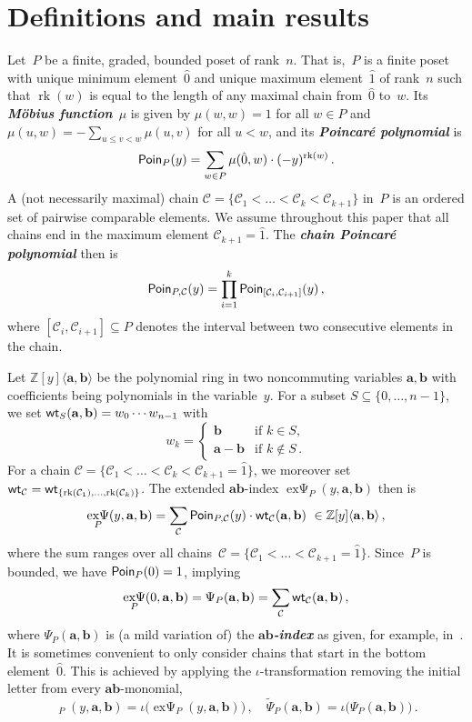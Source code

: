 \documentclass[a4paper, english,reqno, 11pt]{amsart}
\theoremstyle{plain}
\theoremstyle{definition}
\DeclareMathOperator{\expsi}{ex\Psi}
\DeclareMathOperator{\expsitilde}{ex\widetilde{\Psi}}
\newcommand{\rank}{\operatorname{rk}}
\newcommand{\aaa}{\mathbf{a}}
\newcommand{\bbb}{\mathbf{b}}
\newcommand{\ZZ}{\mathbb{Z}}
\newcommand{\Dfn}[1]{\emph{\bfseries #1}}
\newcommand{\wt}{{\sf wt}}
\newcommand{\cC}{\mathcal{C}}
\newcommand{\Poin}{\mathcal{\sf Poin}}
\begin{document}
\section{Definitions and main results}

Let~$P$ be a finite, graded, bounded poset of rank~$n$.
That is,~$P$ is a finite poset with unique minimum element~$\hat 0$ and unique maximum element~$\hat 1$ of rank~$n$ such that $\rank(w)$ is equal to the length of any maximal chain from~$\hat 0$ to~$w$.
Its \Dfn{Möbius function}~$\mu$ is given by $\mu(w, w) = 1$ for all $w\in P$ and $\mu(u,w) = -\sum_{u\leq v < w} \mu(u, v)$ for all $u < w$, and its \Dfn{Poincaré polynomial} is
\[
  \Poin_P(y) = \sum_{w\in P} \mu(\hat{0}, w) \cdot (-y)^{\rank(w)}\,.
\]
A (not necessarily maximal) chain $\cC = \{\cC_1 < \dots < \cC_k < \cC_{k+1}\}$ in~$P$ is an ordered set of pairwise comparable elements.
We assume throughout this paper that all chains end in the maximum element $\cC_{k+1} = \hat 1$.
The \Dfn{chain Poincaré polynomial} then is
\[
  \Poin_{P,\cC}(y)   =\prod_{i = 1}^k \Poin_{[\cC_i,\cC_{i+1}]}(y) \,,
\]
where $[\cC_i,\cC_{i+1}] \subseteq P$ denotes the interval between two consecutive elements in the chain.

\medskip

Let $\ZZ[y]\langle\aaa,\bbb\rangle$ be the polynomial ring in two noncommuting variables $\aaa,\bbb$ with coefficients being polynomials in the variable~$y$.
For a subset $S \subseteq \{0,\dots,n-1\}$, we set $\wt_S(\aaa,\bbb) = w_0\cdots w_{n-1}$ with
\begin{equation*}
  w_k = \begin{cases}
          \bbb        & \text{if } k\in S, \\
          \aaa - \bbb & \text{if } k\notin S\,.
        \end{cases}
\end{equation*}
For a chain $\cC = \{\cC_1 < \dots < \cC_k < \cC_{k+1} = \hat 1\}$, we moreover set $\wt_\cC = \wt_{\{\rank(\cC_1),\dots,\rank(\cC_k)\}}$.
The extended $\aaa\bbb$-index $\expsi_P(y,\aaa,\bbb)$ then is
\[
\expsi_P(y,\aaa,\bbb)
  = \sum_{\cC} \Poin_{P,\cC}(y) \cdot \wt_{\cC}(\aaa,\bbb) \ \in \ZZ[y]\langle\aaa,\bbb\rangle\,,
\]
where the sum ranges over all chains~$\cC = \{\cC_1 <\dots < \cC_{k+1} = \hat 1\}$.
Since~$P$ is bounded, we have $\Poin_P(0) = 1$, implying
\begin{equation}
\label{eq:abindex}
  \expsi_P(0,\aaa,\bbb)
  = \Psi_P(\aaa,\bbb)
  = \sum_{\cC} \wt_\cC(\aaa,\bbb)\,,
\end{equation}
where $\Psi_P(\aaa,\bbb)$ is (a mild variation of) the \Dfn{$\aaa\bbb$-index}  as given, for example, in~\cite{bayer-survey}.
It is sometimes convenient to only consider chains that start in the bottom element~$\hat 0$.
This is achieved by applying the $\iota$-transformation removing the initial letter from every $\aaa\bbb$-monomial,
\[
  \expsitilde_P(y,\aaa,\bbb)    = \iota\big(\expsi_P(y,\aaa,\bbb)\big)\,,\quad
  \widetilde\Psi_P(\aaa,\bbb) = \iota\big(\Psi_P(\aaa,\bbb)\big)\,.
\]
\end{document}
